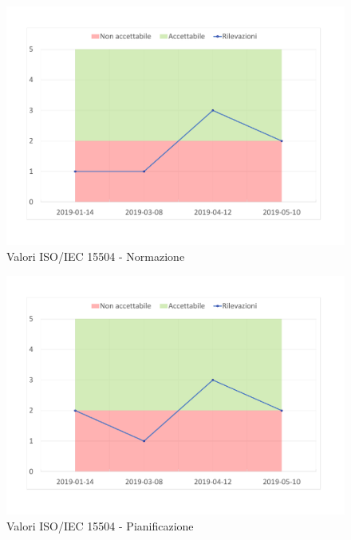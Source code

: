 \begin{figure}[H]
	\centering
	\includegraphics[scale=0.6]{images/resoconto/Normazione.pdf}
	\caption{Valori ISO/IEC 15504 - Normazione}	
\end{figure}


\begin{figure}[H]
	\centering
	\includegraphics[scale=0.6]{images/resoconto/Pianificazione.pdf}
	\caption{Valori ISO/IEC 15504 - Pianificazione}	
\end{figure}


